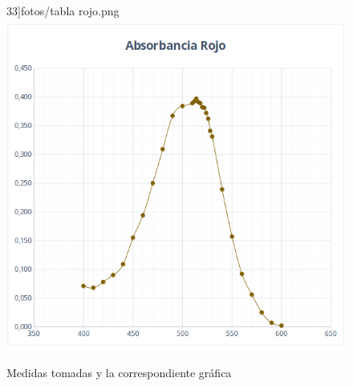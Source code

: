 \begin{figure}[H]
33]{fotos/tabla rojo.png} 
    \includegraphics[scale = 0.433]{fotos/abs rojo.png}   
    \caption{Medidas tomadas y la correspondiente gráfica}
    \label{fig:cris3}
\end{figure}

